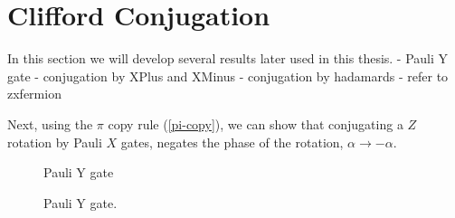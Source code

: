 

\newpage
\section{Clifford Conjugation}

In this section we will develop several results later used in this thesis.
- Pauli Y gate
- conjugation by XPlus and XMinus
- conjugation by hadamards
- refer to zxfermion

Next, using the $\pi$ copy rule (\ref{pi-copy}), we can show that conjugating a $Z$ rotation by Pauli $X$ gates, negates the phase of the rotation, $\alpha \rightarrow -\alpha$.


\begin{figure}[H]
    \centering
    Pauli Y gate
    \caption{Pauli Y gate.}
    \label{pauli-Y}
\end{figure}

